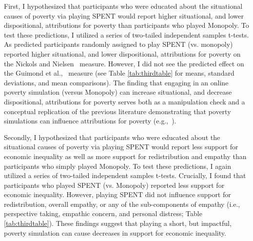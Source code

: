\documentclass{sfuthesis}
\begin{document}
First, I hypothesized that participants who were educated about the situational causes of poverty via playing SPENT would report higher situational, and lower dispositional, attributions for poverty than participants who played Monopoly. To test these predictions, I utilized a series of two-tailed independent samples t-tests. As predicted participants randomly assigned to play SPENT (vs. monopoly) reported higher situational, and lower dispositional, attributions for poverty on the Nickols and Nielsen~\cite{nickols11} measure. However, I did not see the predicted effect on the Guimond et al.,~\cite{guimond89} measure (see Table \ref{tab:thirdtable} for means, standard deviations, and mean comparisons). The finding that engaging in an online poverty simulation (versus Monopoly) can increase situational, and decrease dispositional, attributions for poverty serves both as a manipulation check and a conceptual replication of the previous literature demonstrating that poverty simulations can influence attributions for poverty (e.g.,~\cite{menzel14}). 

Secondly, I hypothesized that participants who were educated about the situational causes of poverty via playing SPENT would report less support for economic inequality as well as more support for redistribution and empathy than participants who simply played Monopoly. To test these predictions, I again utilized a series of two-tailed independent samples t-tests. Crucially, I found that participants who played SPENT (vs. Monopoly) reported less support for economic inequality. However, playing SPENT did not influence support for redistribution, overall empathy, or any of the sub-components of empathy (i.e., perspective taking, empathic concern, and personal distress; Table \ref{tab:thirdtable}). These findings suggest that playing a short, but impactful, poverty simulation can cause decreases in support for economic inequality. 
\end{document}
